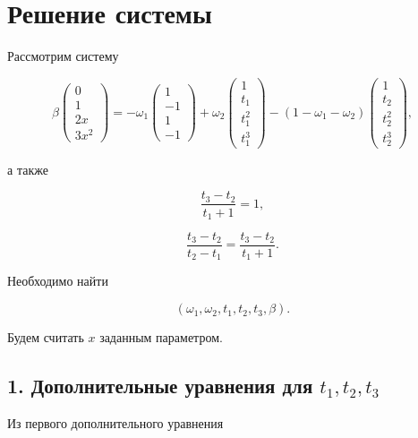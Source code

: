 \documentclass[a4paper,12pt]{article}
\begin{document}
	
	\section*{Решение системы}
	
	Рассмотрим систему
	
	\begin{equation}
		\beta
		\begin{pmatrix}
			0\\
			1\\
			2x\\
			3x^2
		\end{pmatrix}
		=
		-\omega_1
		\begin{pmatrix}
			1\\
			-1\\
			1\\
			-1
		\end{pmatrix}
		+
		\omega_2
		\begin{pmatrix}
			1\\
			t_1\\
			t_1^2\\
			t_1^3
		\end{pmatrix}
		-
		(1-\omega_1-\omega_2)
		\begin{pmatrix}
			1\\
			t_2\\
			t_2^2\\
			t_2^3
		\end{pmatrix},
	\end{equation}
	
	а также
	
	\begin{equation}
		\frac{t_3-t_2}{t_1+1}=1,
	\end{equation}
	
	\begin{equation}
		\frac{t_3-t_2}{t_2-t_1}
		=
		\frac{t_3-t_2}{t_1+1}.
	\end{equation}
	
	Необходимо найти
	
	\[
	(\omega_1,\omega_2,t_1,t_2,t_3,\beta).
	\]
	
	Будем считать $x$ заданным параметром.
	
	\subsection*{1. Дополнительные уравнения для $t_1,t_2,t_3$}
	
	Из первого дополнительного уравнения
	
\end{document}
